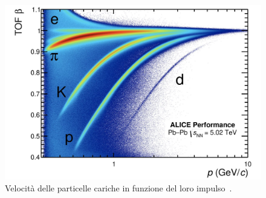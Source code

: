     \begin{figure}[p]
        \centering
        \includegraphics[width=1\linewidth]{res/fig/2-chapter/8-ALICE-PbPb5.02TeV-performance.jpg}
        \caption{Velocità delle particelle cariche in funzione del loro impulso~\cite{ALICE-PbPb5.02TeV-performance}.}
        \label{fig:2-8-ALICE-PbPb5.02TeV-performance}
    \end{figure}